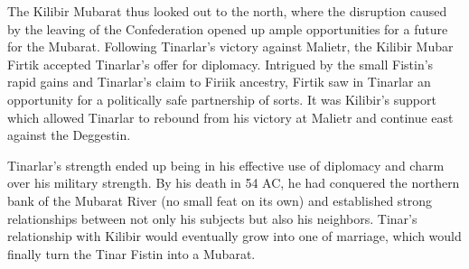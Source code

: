 \begin{multicols}{2}
						The Kilibir Mubarat thus looked out to the north, where the disruption caused by the leaving of the Confederation opened up ample opportunities for a future for the Mubarat. Following Tinarlar's victory against Malietr, the Kilibir Mubar Firtik accepted Tinarlar's offer for diplomacy. Intrigued by the small Fistin's rapid gains and Tinarlar's claim to Firiik ancestry, Firtik saw in Tinarlar an opportunity for a politically safe partnership of sorts. It was Kilibir's support which allowed Tinarlar to rebound from his victory at Malietr and continue east against the Deggestin. 
					
						Tinarlar's strength ended up being in his effective use of diplomacy and charm over his military strength. By his death in 54 AC, he had conquered the northern bank of the Mubarat River (no small feat on its own) and established strong relationships between not only his subjects but also his neighbors. Tinar's relationship with Kilibir would eventually grow into one of marriage, which would finally turn the Tinar Fistin into a Mubarat.
\end{multicols}

